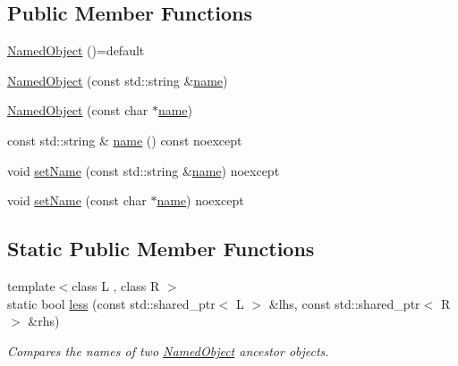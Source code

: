 \subsection*{Public Member Functions}
\begin{DoxyCompactItemize}
\item 
\hyperlink{classdg_1_1deepcore_1_1_named_object_ad961e926a260db17b2177542ba7687d1}{Named\+Object} ()=default
\item 
\hyperlink{classdg_1_1deepcore_1_1_named_object_a6d3133ab2dc0f7127192b46de021d5a1}{Named\+Object} (const std\+::string \&\hyperlink{classdg_1_1deepcore_1_1_named_object_ab1379a28467dd39a81ceb02cf50dedde}{name})
\item 
\hyperlink{classdg_1_1deepcore_1_1_named_object_a856e8a4b66ef76a9837386311cf92277}{Named\+Object} (const char $\ast$\hyperlink{classdg_1_1deepcore_1_1_named_object_ab1379a28467dd39a81ceb02cf50dedde}{name})
\item 
const std\+::string \& \hyperlink{classdg_1_1deepcore_1_1_named_object_ab1379a28467dd39a81ceb02cf50dedde}{name} () const noexcept
\item 
void \hyperlink{classdg_1_1deepcore_1_1_named_object_ae40cdb77f5fd88ce2f7473942711e6c3}{set\+Name} (const std\+::string \&\hyperlink{classdg_1_1deepcore_1_1_named_object_ab1379a28467dd39a81ceb02cf50dedde}{name}) noexcept
\item 
void \hyperlink{classdg_1_1deepcore_1_1_named_object_abb68a2f738c0d6ccf6a5f6ebcae44ffb}{set\+Name} (const char $\ast$\hyperlink{classdg_1_1deepcore_1_1_named_object_ab1379a28467dd39a81ceb02cf50dedde}{name}) noexcept
\end{DoxyCompactItemize}
\subsection*{Static Public Member Functions}
\begin{DoxyCompactItemize}
\item 
{\footnotesize template$<$class L , class R $>$ }\\static bool \hyperlink{classdg_1_1deepcore_1_1_named_object_a632522cfca5a733344ff62f628336baa}{less} (const std\+::shared\+\_\+ptr$<$ L $>$ \&lhs, const std\+::shared\+\_\+ptr$<$ R $>$ \&rhs)
\begin{DoxyCompactList}\small\item\em Compares the names of two \hyperlink{classdg_1_1deepcore_1_1_named_object}{Named\+Object} ancestor objects. \end{DoxyCompactList}\end{DoxyCompactItemize}
